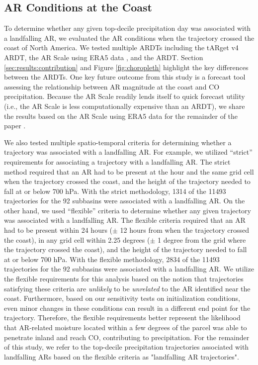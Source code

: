 \documentclass[draft]{agujournal2019}
\begin{document}
\subsection{AR Conditions at the Coast}
\label{sec:methods:ar_conditions}
To determine whether any given top-decile precipitation day was associated with a landfalling AR, we evaluated the AR conditions when the trajectory crossed the coast of North America. We tested multiple ARDTs including the  tARget v4 ARDT, the AR Scale using ERA5 data \cite{MartinRalph2019}, and the  ARDT. Section \ref{sec:results:contribution} and Figure \ref{fig:choropleth} highlight the key differences between the ARDTs. One key future outcome from this study is a forecast tool assessing the relationship between AR magnitude at the coast and CO precipitation. Because the AR Scale readily lends itself to quick forecast utility (i.e., the AR Scale is less computationally expensive than an ARDT), we share the results based on the AR Scale using ERA5 data for the remainder of the paper \cite{MartinRalph2019}.

We also tested multiple spatio-temporal criteria for determining whether a trajectory was associated with a landfalling AR. For example, we utilized “strict” requirements for associating a trajectory with a landfalling AR. The strict method required that an AR had to be present at the hour and the same grid cell when the trajectory crossed the coast, and the height of the trajectory needed to fall at or below 700 hPa. With the strict methodology, 1314 of the 11493 trajectories for the 92 subbasins were associated with a landfalling AR. On the other hand, we used “flexible” criteria to determine whether any given trajectory was associated with a landfalling AR. The flexible criteria required that an AR had to be present within 24 hours ($\pm$ 12 hours from when the trajectory crossed the coast), in any grid cell within 2.25 degrees ($\pm$ 1 degree from the grid where the trajectory crossed the coast), and the height of the trajectory needed to fall at or below 700 hPa. With the flexible methodology, 2834 of the 11493 trajectories for the 92 subbasins were associated with a landfalling AR. We utilize the flexible requirements for this analysis based on the notion that trajectories satisfying these criteria are \textit{unlikely} to be \textit{unrelated} to the AR identified near the coast. Furthermore, based on our sensitivity tests on initialization conditions, even minor changes in these conditions can result in a different end point for the trajectory. Therefore, the flexible requirements better represent the likelihood that AR-related moisture located within a few degrees of the parcel was able to penetrate inland and reach CO, contributing to precipitation. For the remainder of this study, we refer to the top-decile precipitation trajectories associated with landfalling ARs based on the flexible criteria as "landfalling AR trajectories". 
\end{document}
